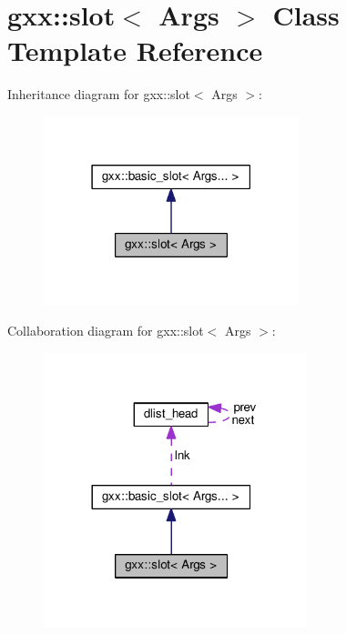 \hypertarget{classgxx_1_1slot}{}\section{gxx\+:\+:slot$<$ Args $>$ Class Template Reference}
\label{classgxx_1_1slot}


Inheritance diagram for gxx\+:\+:slot$<$ Args $>$\+:
\nopagebreak
\begin{figure}[H]
\begin{center}
\leavevmode
\includegraphics[width=210pt]{classgxx_1_1slot__inherit__graph}
\end{center}
\end{figure}


Collaboration diagram for gxx\+:\+:slot$<$ Args $>$\+:
\nopagebreak
\begin{figure}[H]
\begin{center}
\leavevmode
\includegraphics[width=216pt]{classgxx_1_1slot__coll__graph}
\end{center}
\end{figure}
